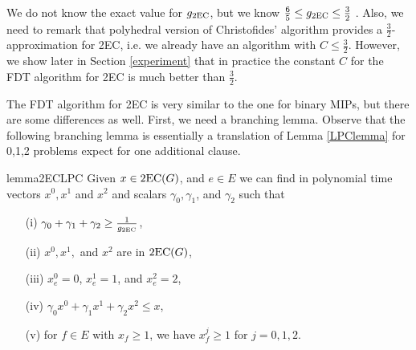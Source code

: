 \documentclass[runningheads]{llncs}
\begin{document}
\FDTEC*

We do not know the exact value for $g_{\operatorname{2EC}}$, but we know $\frac{6}{5} \leq g_{\operatorname{2EC}} \leq \frac{3}{2}$ \cite{carr-ravi,Wolsey1980}. Also, we need to remark that polyhedral version of Christofides' algorithm provides a $\frac{3}{2}$-approximation for 2EC, i.e. we already have an algorithm with $C\leq \frac{3}{2}$. However, we show later in Section \ref{experiment} that in practice the constant $C$ for the FDT algorithm for 2EC is much better than $\frac{3}{2}$. 

The FDT algorithm for 2EC is very similar to the one for binary MIPs, but there are some differences as well. First, we need a branching lemma. Observe that  the following branching lemma is essentially a translation of Lemma \ref{LPClemma} for 0,1,2 problems expect for one additional clause. 


\begin{restatable}{lemma}{2ECLPC}
	\label{LPC2EC}
	Given $x\in \operatorname{2EC}(G)$, and $e\in E$ we can find in polynomial time vectors $x^0,x^1$ and $x^2$ and scalars $\gamma_0,\gamma_1$, and $\gamma_2$ such that
	\begin{itemize}
		\item[(i)] $\gamma_0 + \gamma_1 +\gamma_2 \geq \frac{ 1}{g_{\operatorname{2EC}}}$,
		\item[(ii)] $x^0,x^1,$ and $x^2$ are in  $ \operatorname{2EC}(G)$, 
		\item[(iii)] $x^0_e=0$, $x^1_e=1$, and $x^2_e=2$,
		\item[(iv)] $\gamma_0 x^0 + \gamma_1{x}^1  + \gamma_2x^2\leq {x}$,
		\item[(v)] for $f\in E$ with ${x}_f\geq 1$, we have $x^j_f\geq 1$ for $j=0,1,2$. 
	\end{itemize}
\end{restatable}
\end{document}
